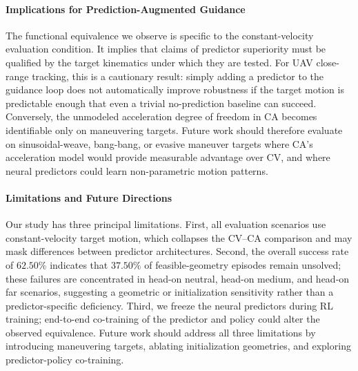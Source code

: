 \paragraph{Implications for Prediction-Augmented Guidance}
The functional equivalence we observe is specific to the constant-velocity evaluation condition. It implies that claims of predictor superiority must be qualified by the target kinematics under which they are tested. For UAV close-range tracking, this is a cautionary result: simply adding a predictor to the guidance loop does not automatically improve robustness if the target motion is predictable enough that even a trivial no-prediction baseline can succeed. Conversely, the unmodeled acceleration degree of freedom in CA becomes identifiable only on maneuvering targets. Future work should therefore evaluate on sinusoidal-weave, bang-bang, or evasive maneuver targets where CA's acceleration model would provide measurable advantage over CV, and where neural predictors could learn non-parametric motion patterns.

\paragraph{Limitations and Future Directions}
Our study has three principal limitations. First, all evaluation scenarios use constant-velocity target motion, which collapses the CV--CA comparison and may mask differences between predictor architectures. Second, the overall success rate of $62.50\%$ indicates that $37.50\%$ of feasible-geometry episodes remain unsolved; these failures are concentrated in head-on neutral, head-on medium, and head-on far scenarios, suggesting a geometric or initialization sensitivity rather than a predictor-specific deficiency. Third, we freeze the neural predictors during RL training; end-to-end co-training of the predictor and policy could alter the observed equivalence. Future work should address all three limitations by introducing maneuvering targets, ablating initialization geometries, and exploring predictor-policy co-training.
